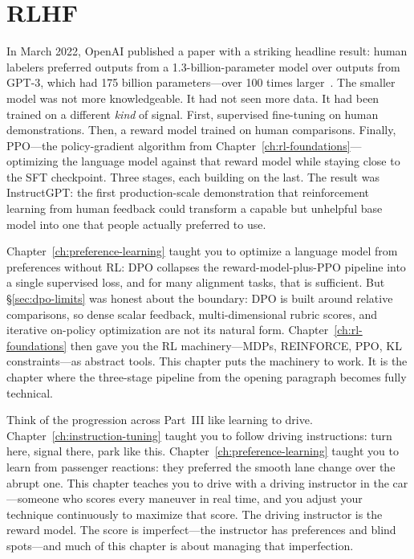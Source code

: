 \chapter{RLHF}
\label{ch:rlhf}
\raggedbottom

In March 2022, OpenAI published a paper with a striking headline result: human labelers preferred outputs from a 1.3-billion-parameter model over outputs from GPT-3, which had 175 billion parameters---over 100 times larger~\cite{ouyang2022instructgpt}. The smaller model was not more knowledgeable. It had not seen more data. It had been trained on a different \emph{kind} of signal. First, supervised fine-tuning on human demonstrations. Then, a reward model trained on human comparisons. Finally, PPO---the policy-gradient algorithm from Chapter~\ref{ch:rl-foundations}---optimizing the language model against that reward model while staying close to the SFT checkpoint. Three stages, each building on the last. The result was InstructGPT: the first production-scale demonstration that reinforcement learning from human feedback could transform a capable but unhelpful base model into one that people actually preferred to use.

Chapter~\ref{ch:preference-learning} taught you to optimize a language model from preferences without RL: DPO collapses the reward-model-plus-PPO pipeline into a single supervised loss, and for many alignment tasks, that is sufficient. But \S\ref{sec:dpo-limits} was honest about the boundary: DPO is built around relative comparisons, so dense scalar feedback, multi-dimensional rubric scores, and iterative on-policy optimization are not its natural form. Chapter~\ref{ch:rl-foundations} then gave you the RL machinery---MDPs, REINFORCE, PPO, KL constraints---as abstract tools. This chapter puts the machinery to work. It is the chapter where the three-stage pipeline from the opening paragraph becomes fully technical.

Think of the progression across Part~III like learning to drive. Chapter~\ref{ch:instruction-tuning} taught you to follow driving instructions: turn here, signal there, park like this. Chapter~\ref{ch:preference-learning} taught you to learn from passenger reactions: they preferred the smooth lane change over the abrupt one. This chapter teaches you to drive with a driving instructor in the car---someone who scores every maneuver in real time, and you adjust your technique continuously to maximize that score. The driving instructor is the reward model. The score is imperfect---the instructor has preferences and blind spots---and much of this chapter is about managing that imperfection.

